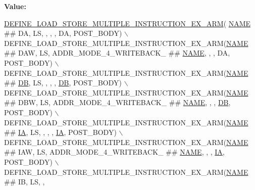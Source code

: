{\bfseries Value\+:}
\begin{DoxyCode}
\mbox{\hyperlink{isa-arm_8c_a29008e696fccc7169c2f74f616735efe}{DEFINE\_LOAD\_STORE\_MULTIPLE\_INSTRUCTION\_EX\_ARM}}(
      \mbox{\hyperlink{inflate_8h_a164ea0159d5f0b5f12a646f25f99eceaa67bc2ced260a8e43805d2480a785d312}{NAME}} ## DA,   LS,                               ,           ,            , DA, POST\_BODY) \(\backslash\)
    DEFINE\_LOAD\_STORE\_MULTIPLE\_INSTRUCTION\_EX\_ARM(\mbox{\hyperlink{inflate_8h_a164ea0159d5f0b5f12a646f25f99eceaa67bc2ced260a8e43805d2480a785d312}{NAME}} ## DAW,  LS, ADDR\_MODE\_4\_WRITEBACK\_ ## 
      \mbox{\hyperlink{inflate_8h_a164ea0159d5f0b5f12a646f25f99eceaa67bc2ced260a8e43805d2480a785d312}{NAME}},           ,            , DA, POST\_BODY) \(\backslash\)
    DEFINE\_LOAD\_STORE\_MULTIPLE\_INSTRUCTION\_EX\_ARM(\mbox{\hyperlink{inflate_8h_a164ea0159d5f0b5f12a646f25f99eceaa67bc2ced260a8e43805d2480a785d312}{NAME}} ## \mbox{\hyperlink{isa-thumb_8c_ad4dd2bbef91d8d1a17ca7b9ad41203cd}{DB}},   LS,                               ,  
               ,            , \mbox{\hyperlink{isa-thumb_8c_ad4dd2bbef91d8d1a17ca7b9ad41203cd}{DB}}, POST\_BODY) \(\backslash\)
    DEFINE\_LOAD\_STORE\_MULTIPLE\_INSTRUCTION\_EX\_ARM(\mbox{\hyperlink{inflate_8h_a164ea0159d5f0b5f12a646f25f99eceaa67bc2ced260a8e43805d2480a785d312}{NAME}} ## DBW,  LS, ADDR\_MODE\_4\_WRITEBACK\_ ## 
      \mbox{\hyperlink{inflate_8h_a164ea0159d5f0b5f12a646f25f99eceaa67bc2ced260a8e43805d2480a785d312}{NAME}},           ,            , \mbox{\hyperlink{isa-thumb_8c_ad4dd2bbef91d8d1a17ca7b9ad41203cd}{DB}}, POST\_BODY) \(\backslash\)
    DEFINE\_LOAD\_STORE\_MULTIPLE\_INSTRUCTION\_EX\_ARM(\mbox{\hyperlink{inflate_8h_a164ea0159d5f0b5f12a646f25f99eceaa67bc2ced260a8e43805d2480a785d312}{NAME}} ## \mbox{\hyperlink{isa-thumb_8c_a3048b70ae3e6d982e60f063bd78fda51}{IA}},   LS,                               ,  
               ,            , \mbox{\hyperlink{isa-thumb_8c_a3048b70ae3e6d982e60f063bd78fda51}{IA}}, POST\_BODY) \(\backslash\)
    DEFINE\_LOAD\_STORE\_MULTIPLE\_INSTRUCTION\_EX\_ARM(\mbox{\hyperlink{inflate_8h_a164ea0159d5f0b5f12a646f25f99eceaa67bc2ced260a8e43805d2480a785d312}{NAME}} ## IAW,  LS, ADDR\_MODE\_4\_WRITEBACK\_ ## 
      \mbox{\hyperlink{inflate_8h_a164ea0159d5f0b5f12a646f25f99eceaa67bc2ced260a8e43805d2480a785d312}{NAME}},           ,            , \mbox{\hyperlink{isa-thumb_8c_a3048b70ae3e6d982e60f063bd78fda51}{IA}}, POST\_BODY) \(\backslash\)
    DEFINE\_LOAD\_STORE\_MULTIPLE\_INSTRUCTION\_EX\_ARM(\mbox{\hyperlink{inflate_8h_a164ea0159d5f0b5f12a646f25f99eceaa67bc2ced260a8e43805d2480a785d312}{NAME}} ## IB,   LS,                               ,    

\end{DoxyCode}
